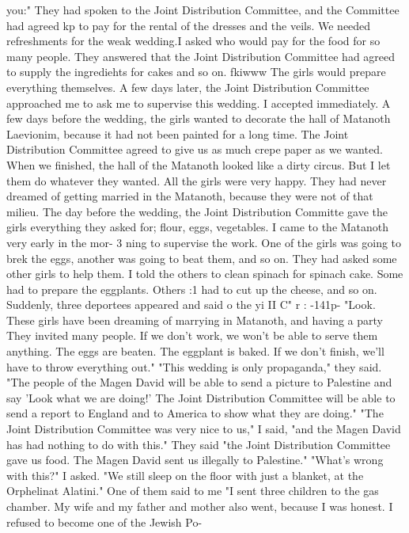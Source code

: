you:" They had spoken to the Joint Distribution Committee, and the Committee had agreed 
kp to pay for the rental of the dresses and the veils. We needed refreshments for the weak 
wedding.I asked who would pay for the food for so many people. They answered that the 
Joint Distribution Committee had agreed to supply the ingrediehts for cakes and so on. 
fkiwww The girls would prepare everything themselves. 
A few days later, the Joint Distribution Committee approached me to ask me to 
supervise this wedding. I accepted immediately. A few days before the wedding, the girls 
wanted to decorate the hall of Matanoth Laevionim, because it had not been painted for 
a long time. The Joint Distribution Committee agreed to give us as much crepe paper 
as we wanted. When we finished, the hall of the Matanoth looked like a dirty circus. 
But I let them do whatever they wanted. All the girls were very happy. They had never 
dreamed of getting married in the Matanoth, because they were not of that milieu. 
The day before the wedding, the Joint Distribution Committe gave the girls everything 
they asked for; flour, eggs, vegetables. I came to the Matanoth very early in the mor-
3 
ning to supervise the work. One of the girls was going to brek the eggs, another was 
going to beat them, and so on. They had asked some other girls to help them. I told 
the others to clean spinach for spinach cake. Some had to prepare the eggplants. Others 
:1 had to cut up the cheese, and so on. 
Suddenly, three deportees appeared and said o the yi 
II C" 
r : 
-141p-
"Look. These girls have been dreaming of marrying in Matanoth, and having a party 
They invited many people. If we don't work, we won't be able to serve them anything. 
The eggs are beaten. The eggplant is baked. If we don't finish, we'll have to throw 
everything out." 
"This wedding is only propaganda," they said. "The people of the Magen David 
will be able to send a picture to Palestine and say 'Look what we are doing!' The 
Joint Distribution Committee will be able to send a report to England and to America 
to show what they are doing." 
"The Joint Distribution Committee was very nice to us," I said, "and the Magen 
David has had nothing to do with this." 
They said "the Joint Distribution Committee gave us food. The Magen David sent 
us illegally to Palestine." 
"What's wrong with this?" I asked. 
"We still sleep on the floor with just a blanket, at the Orphelinat Alatini." One 
of them said to me "I sent three children to the gas chamber. My wife and my father 
and mother also went, because I was honest. I refused to become one of the Jewish Po-
